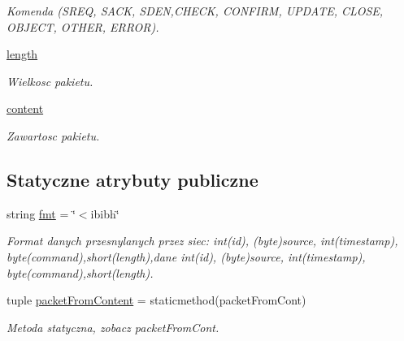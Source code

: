 \begin{DoxyCompactItemize}
\begin{DoxyCompactList}\small\item\em Komenda (SREQ, SACK, SDEN,CHECK, CONFIRM, UPDATE, CLOSE, OBJECT, OTHER, ERROR). \item\end{DoxyCompactList}\item 
\hypertarget{class_serv_1_1_packet_1_1_packet_adf68d3f40f5a7583fce563366f2f9e61}{
\hyperlink{class_serv_1_1_packet_1_1_packet_adf68d3f40f5a7583fce563366f2f9e61}{length}}
\label{class_serv_1_1_packet_1_1_packet_adf68d3f40f5a7583fce563366f2f9e61}

\begin{DoxyCompactList}\small\item\em Wielkosc pakietu. \item\end{DoxyCompactList}\item 
\hypertarget{class_serv_1_1_packet_1_1_packet_a24efe22ef361ee7d966a663e96241820}{
\hyperlink{class_serv_1_1_packet_1_1_packet_a24efe22ef361ee7d966a663e96241820}{content}}
\label{class_serv_1_1_packet_1_1_packet_a24efe22ef361ee7d966a663e96241820}

\begin{DoxyCompactList}\small\item\em Zawartosc pakietu. \item\end{DoxyCompactList}\end{DoxyCompactItemize}
\subsection*{Statyczne atrybuty publiczne}
\begin{DoxyCompactItemize}
\item 
\hypertarget{class_serv_1_1_packet_1_1_packet_a0406f36f89d9da4feb94f31959367ce8}{
string \hyperlink{class_serv_1_1_packet_1_1_packet_a0406f36f89d9da4feb94f31959367ce8}{fmt} = \char`\"{}$<$ibibh\char`\"{}}
\label{class_serv_1_1_packet_1_1_packet_a0406f36f89d9da4feb94f31959367ce8}

\begin{DoxyCompactList}\small\item\em Format danych przesnylanych przez siec: int(id), (byte)source, int(timestamp), byte(command),short(length),dane int(id), (byte)source, int(timestamp), byte(command),short(length). \item\end{DoxyCompactList}\item 
\hypertarget{class_serv_1_1_packet_1_1_packet_a145ac89df7bc66728e8b3e642650aff4}{
tuple \hyperlink{class_serv_1_1_packet_1_1_packet_a145ac89df7bc66728e8b3e642650aff4}{packetFromContent} = staticmethod(packetFromCont)}
\label{class_serv_1_1_packet_1_1_packet_a145ac89df7bc66728e8b3e642650aff4}

\begin{DoxyCompactList}\small\item\em Metoda statyczna, zobacz packetFromCont. \item\end{DoxyCompactList}\end{DoxyCompactItemize}


